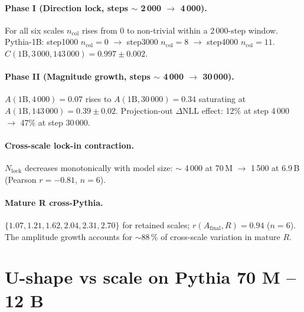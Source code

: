 \documentclass[11pt,a4paper]{article}
\begin{document}
\paragraph{Phase I (Direction lock, steps $\sim$ 2\,000 $\to$ 4\,000).}
For all six scales $n_\mathrm{col}$ rises from 0 to non-trivial
within a 2\,000-step window.  Pythia-1B: step1000 $n_\mathrm{col} = 0$
$\to$ step3000 $n_\mathrm{col} = 8$ $\to$ step4000
$n_\mathrm{col} = 11$.  $C(1\mathrm{B}, 3\,000, 143\,000)
= 0.997 \pm 0.002$.

\paragraph{Phase II (Magnitude growth, steps $\sim$ 4\,000 $\to$ 30\,000).}
$A(1\mathrm{B}, 4\,000) = 0.07$ rises to
$A(1\mathrm{B}, 30\,000) = 0.34$ saturating at
$A(1\mathrm{B}, 143\,000) = 0.39 \pm 0.02$.  Projection-out
$\Delta$NLL effect: 12\% at step 4\,000 $\to$ 47\% at step 30\,000.

\paragraph{Cross-scale lock-in contraction.}
$N_\mathrm{lock}$ decreases monotonically with model size: $\sim$
4\,000 at 70\,M $\to$ 1\,500 at 6.9\,B (Pearson $r = -0.81$, $n = 6$).

\paragraph{Mature R cross-Pythia.}
$\{1.07, 1.21, 1.62, 2.04, 2.31, 2.70\}$ for retained scales;
$r(A_\mathrm{final}, R) = 0.94$ ($n = 6$).  The amplitude growth
accounts for $\sim 88\,\%$ of cross-scale variation in mature $R$.

\section{U-shape vs scale on Pythia 70 M -- 12 B}
\label{si:S4}
\end{document}
